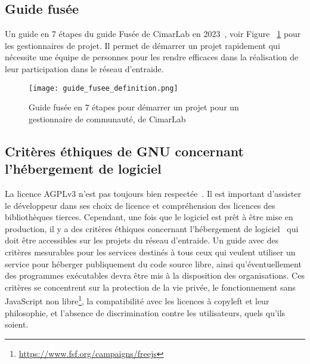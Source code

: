 \subsection{Guide fusée}

Un guide en 7 étapes du guide Fusée de CimarLab en 2023~\cite{guide_fusee}, voir Figure ~\ref{fig:guide_fusee} pour les gestionnaires de projet. Il permet de démarrer un projet rapidement qui nécessite une équipe de personnes pour les rendre efficaces dans la réalisation de leur participation dans le réseau d’entraide.

\begin{figure}[htb]
\centering
\texttt{[image: guide\_fusee\_definition.png]}
\caption{Guide fusée en 7 étapes pour démarrer un projet pour un gestionnaire de communauté, de CimarLab~\cite{guide_fusee}}
\label{fig:guide_fusee}
\end{figure}

\subsection{Critères éthiques de GNU concernant l'hébergement de logiciel}

La licence AGPLv3 n’est pas toujours bien respectée~\cite{violation_libre_2017}. Il est important d'assister le développeur dans ses choix de licence et compréhension des licences des bibliothèques tierces. Cependant, une fois que le logiciel est prêt à être mise en production, il y a des critères éthiques concernant l'hébergement de logiciel~\cite{gnu_critere_hebergement_2022} qui doit être accessibles sur les projets du réseau d’entraide. Un guide avec des critères mesurables pour les services destinés à tous ceux qui veulent utiliser un service pour héberger publiquement du code source libre, ainsi qu'éventuellement des programmes exécutables devra être mis à la disposition des organisations. Ces critères se concentrent sur la protection de la vie privée, le fonctionnement sans JavaScript non libre\footnote{\url{https://www.fsf.org/campaigns/freejs}}, la compatibilité avec les licences à copyleft et leur philosophie, et l'absence de discrimination contre les utilisateurs, quels qu'ils soient. 

